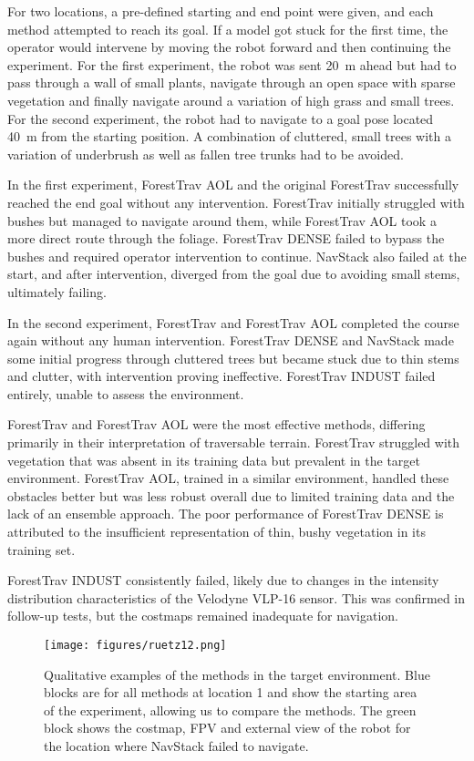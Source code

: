For two locations, a pre-defined starting and end point were given, and each method attempted to reach its goal. If a model got stuck for the first time, the operator would intervene by moving the robot forward and then continuing the experiment. For the first experiment, the robot was sent \qty{20}{\m} ahead but had to pass through a wall of small plants, navigate through an open space with sparse vegetation and finally navigate around a variation of high grass and small trees. 
For the second experiment, the robot had to navigate to a goal pose located \qty{40}{\m} from the starting position. A combination of cluttered, small trees with a variation of underbrush as well as fallen tree trunks had to be avoided.

In the first experiment, ForestTrav AOL and the original ForestTrav successfully reached the end goal without any intervention. ForestTrav initially struggled with bushes but managed to navigate around them, while ForestTrav AOL took a more direct route through the foliage. ForestTrav DENSE failed to bypass the bushes and required operator intervention to continue. NavStack also failed at the start, and after intervention, diverged from the goal due to avoiding small stems, ultimately failing.

In the second experiment, ForestTrav and ForestTrav AOL completed the course again without any human intervention. ForestTrav DENSE and NavStack made some initial progress through cluttered trees but became stuck due to thin stems and clutter, with intervention proving ineffective. ForestTrav INDUST failed entirely, unable to assess the environment.

ForestTrav and ForestTrav AOL were the most effective methods, differing primarily in their interpretation of traversable terrain. ForestTrav struggled with vegetation that was absent in its training data but prevalent in the target environment. ForestTrav AOL, trained in a similar environment, handled these obstacles better but was less robust overall due to limited training data and the lack of an ensemble approach. The poor performance of ForestTrav DENSE is attributed to the insufficient representation of thin, bushy vegetation in its training set.

ForestTrav INDUST consistently failed, likely due to changes in the intensity distribution characteristics of the Velodyne VLP-16 sensor. This was confirmed in follow-up tests, but the costmaps remained inadequate for navigation.

\begin{figure*}
     \centering
    \texttt{[image: figures/ruetz12.png]}
    \caption{Qualitative examples of the methods in the target environment. Blue blocks are for all methods at location 1 and show the starting area of the experiment, allowing us to compare the methods. The green block shows the costmap, FPV and external view of the robot for the location where NavStack failed to navigate. }
    \label{fig:nav_experiment}
\end{figure*}

